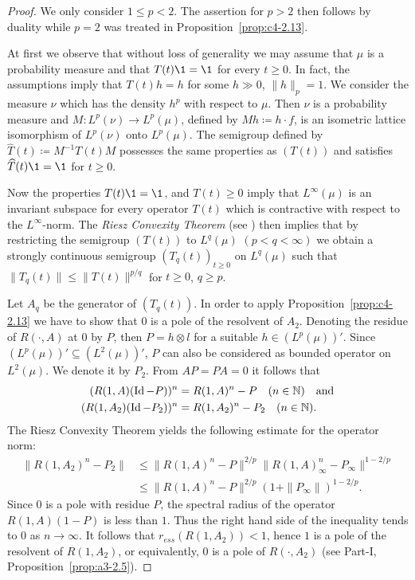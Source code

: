 \begin{proof}
We only consider $1 \leq p < 2$.
The assertion for $p > 2$ then follows by duality while $p = 2$ was treated in Proposition~\ref{prop:c4-2.13}.

At first we observe that without loss of generality we may assume that $\mu$ is a probability measure and that $T(t)\1 = \1$ for every $t \geq 0$.
In fact, the assumptions imply that $T(t)h = h$ for some $h \gg 0$, $\|h\|_{p} = 1$.
We consider the measure $\nu$ which has the density $h^{p}$ with respect to $\mu$.
Then $\nu$ is a probability measure and 
$M \colon L^{p}(\nu) \to L^{p}(\mu)$, defined by $Mh \coloneq h\cdot f$, is an isometric lattice isomorphism of\/ $L^{p}(\nu)$ onto $L^{p}(\mu)$.
The semigroup defined by $\widehat{T}(t) \coloneq M^{-1}T(t)M$ possesses the same properties as $(T(t))$ and satisfies $\widehat{T}(t)\1 = \1$ for $t \geq 0$.

Now the properties $T(t)\1 = \1$, and $T(t) \geq 0$ imply that $L^{\infty}(\mu)$ is an invariant subspace for every operator $T(t)$ which is contractive with respect to the $L^{\infty}$-norm.
The \emph{Riesz Convexity Theorem} (see \textcite[VI.10.11]{dunfordschwartz:1958}) then implies that by restricting the semigroup $(T(t))$ to $L^{q}(\mu)$ $(p < q < \infty)$ we obtain a strongly continuous semigroup $(T_{q}(t))_{t \geq 0}$ on $L^{q}(\mu)$ such that $\|T_{q}(t)\| \leq \|T(t)\|^{p/q}$ for $t \geq 0$, $q \geq p$.

Let $A_{q}$ be the generator of\/ $(T_{q}(t))$.
In order to apply Proposition~\ref{prop:c4-2.13} we have to show that $0$ is a pole of the resolvent of\/ $A_{2}$.
Denoting the residue of\/ $R(\cdot,A)$ at $0$ by $P$, then $P = h \otimes l$ for a suitable $h \in (L^{p}(\mu))'$.
Since $(L^{p}(\mu))' \subseteq (L^{2}(\mu))'$, $P$ can also be considered as bounded operator on $L^{2}(\mu)$.
We denote it by $P_{2}$.
From $AP = PA = 0$ it follows that
\begin{align*}
(R(1,A)(\operatorname{Id}-P))^{n} &= R(1,A)^{n} - P \quad (n \in \mathbb{N}) \quad \text{and} \\
(R(1,A_{2})(\operatorname{Id}-P_{2}))^{n} &= R(1,A_{2})^{n} - P_{2} \quad (n \in \mathbb{N}).
\end{align*}
The Riesz Convexity Theorem yields the following estimate for the operator norm:
\begin{align*}
\|R(1,A_{2})^{n} - P_{2}\| &\leq \|R(1,A)^{n} - P\|^{2/p}\|R(1,A)_{\infty}^{n} - P_{\infty}\|^{1-2/p} \\
&\leq \|R(1,A)^{n} - P\|^{2/p}(1 + \|P_{\infty}\|)^{1-2/p}.
\end{align*}
Since $0$ is a pole with residue $P$, the spectral radius of the operator $R(1,A)(1-P)$ is less than $1$.
Thus the right hand side of the inequality tends to $0$ as $n \to \infty$.
It follows that $r_{ess}(R(1,A_{2})) < 1$, hence $1$ is a pole of the resolvent of\/ $R(1,A_{2})$, or equivalently, $0$ is a pole of\/ $R(\cdot,A_{2})$ (see 
Part-I, Proposition~\ref{prop:a3-2.5}).


\end{proof}
